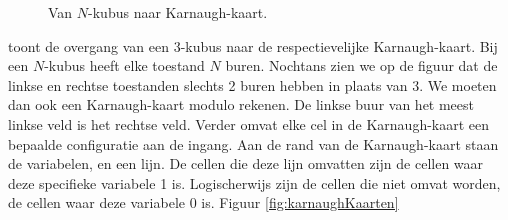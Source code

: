 \begin{figure}[htb]
\caption{Van $N$-kubus naar Karnaugh-kaart.}
\label{fig:nCubeKarnaugh}
\end{figure}
toont de overgang van een 3-kubus naar de respectievelijke Karnaugh-kaart. Bij een $N$-kubus heeft elke toestand $N$ buren. Nochtans zien we op de figuur dat de linkse en rechtse toestanden slechts 2 buren hebben in plaats van 3. We moeten dan ook een Karnaugh-kaart modulo rekenen. De linkse buur van het meest linkse veld is het rechtse veld. Verder omvat elke cel in de Karnaugh-kaart een bepaalde configuratie aan de ingang. Aan de rand van de Karnaugh-kaart staan de variabelen, en een lijn. De cellen die deze lijn omvatten zijn de cellen waar deze specifieke variabele 1 is. Logischerwijs zijn de cellen die niet omvat worden, de cellen waar deze variabele 0 is. Figuur \ref{fig:karnaughKaarten}
